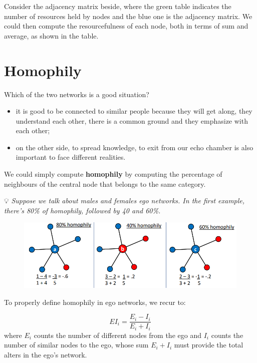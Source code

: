 \documentclass[
  notitlepage,
  onecolumn,
  openany]{book}
\providecommand{\tightlist}{%
  \setlength{\itemsep}{0pt}\setlength{\parskip}{0pt}}
\begin{document}
Consider the adjacency matrix beside, where the green table indicates the number of resources held by nodes and the blue one is the adjacency matrix. We could then compute the resourcefulness of each node, both in terms of sum and average, as shown in the table.

\hypertarget{homophily}{%
\section{Homophily}\label{homophily}}

Which of the two networks is a good situation?

\begin{itemize}
\tightlist
\item
  it is good to be connected to similar people because they will get along, they understand each other, there is a common ground and they emphasize with each other;
\item
  on the other side, to spread knowledge, to exit from our echo chamber is also important to face different realities.
\end{itemize}

We could simply compute \textbf{homophily} by computing the percentage of neighbours of the central node that belongs to the same category.

💡 \emph{Suppose we talk about males and females ego networks. In the first example, there's 80\% of homophily, followed by 40 and 60\%.}

\begin{figure}[h!]

{\centering \includegraphics[width=0.7\linewidth]{images/06-Attributes based measures/Untitled 2} 

}

\end{figure}

To properly define homophily in ego networks, we recur to:

\[
EI_i = \frac{E_i-I_i}{E_i+I_i}
\]
where \(E_i\) counts the number of different nodes from the ego and \(I_i\) counts the number of similar nodes to the ego, whose sum \(E_i+I_i\) must provide the total alters in the ego's network.
\end{document}
